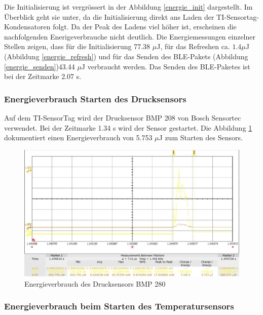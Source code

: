 \clearpage

Die Initialisierung ist vergrössert in der Abbildung  \ref{energie_init} dargestellt. Im Überblick geht sie unter, da die Initialisierung direkt ans Laden der TI-Sensortag-Kondensatoren folgt. Da der Peak des Ladens viel höher ist, erscheinen die nachfolgenden Enerigeverbrauche nicht deutlich. Die Energiemessungen einzelner Stellen zeigen, dass für die Initialisierung 77.38 $\mu$J, für das Refreshen ca. $1.4\mu$J (Abbildung \ref{energie_refresh}) und für das Senden des BLE-Pakets (Abbildung \ref{energie_senden})43.44 $\mu$J verbraucht werden. Das Senden des BLE-Paketes ist bei der Zeitmarke 2.07 s.


\subsubsection*{Energieverbrauch Starten des Drucksensors}

Auf dem TI-SensorTag wird der Drucksensor BMP 208 von Bosch Sensortec verwendet. Bei der Zeitmarke 1.34 s wird der Sensor gestartet. Die Abbildung \ref{energie_drucksensor} dokumentiert einen Energieverbrauch von 5.753 $\mu$J zum Starten des Sensors.

\begin{figure}[ht]
  \includegraphics[width=1.0\textwidth]{3Vorgehen/imag/Drucksensor.png}
  \caption{Energieverbrauch des Drucksensors BMP 280}
  \label{energie_drucksensor}
\end{figure}

\clearpage

\subsubsection*{Energieverbrauch beim Starten des Temperatursensors}

